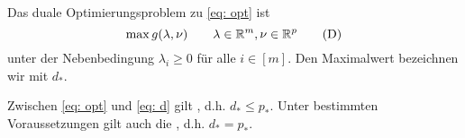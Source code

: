 \begin{*definition}
	Das duale Optimierungsproblem zu \eqref{eq: opt} ist
	\begin{equation*}
		\max g(\lambda, \nu) \qquad \lambda \in \mathbb{R}^m, \nu \in \mathbb{R}^p
		\tag{D} \label{eq: d}
	\end{equation*}
	unter der Nebenbedingung $\lambda_i \ge 0$ für alle $i \in [m]$. Den Maximalwert bezeichnen wir mit $d_\ast$.
\end{*definition}

Zwischen \eqref{eq: opt} und \eqref{eq: d} gilt , d.h. $d_\ast \le p_\ast$.
Unter bestimmten Voraussetzungen gilt auch die , d.h. $d_\ast = p_\ast$.